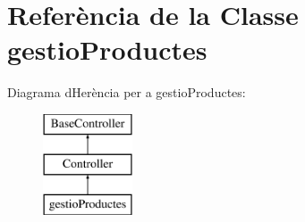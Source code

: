 \hypertarget{class_app_1_1_http_1_1_controllers_1_1gestio_productes}{}\section{Referència de la Classe gestio\+Productes}
\label{class_app_1_1_http_1_1_controllers_1_1gestio_productes}
Diagrama d\textquotesingle{}Herència per a gestio\+Productes\+:\begin{figure}[H]
\begin{center}
\leavevmode
\includegraphics[height=3.000000cm]{class_app_1_1_http_1_1_controllers_1_1gestio_productes}
\end{center}
\end{figure}
